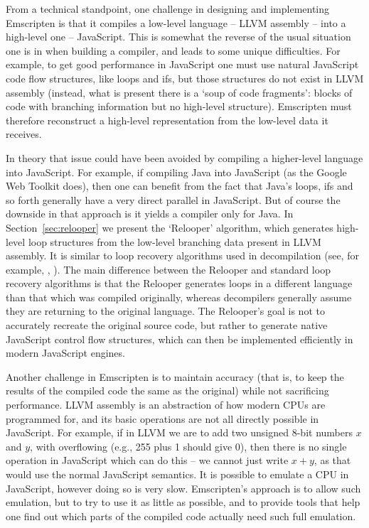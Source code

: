 \documentclass[preprint,10pt]{sigplanconf}
\begin{document}
From a technical standpoint, one challenge in designing and implementing
Emscripten is that it compiles a low-level language -- LLVM assembly -- into
a high-level one -- JavaScript. This is somewhat the reverse of the usual
situation one is in when building a compiler, and leads to some unique
difficulties. For example, to get good performance in JavaScript one must
use natural JavaScript code flow structures, like loops and ifs, but
those structures do not exist in LLVM assembly (instead, what is present
there is a `soup of code fragments': blocks of code with branching information
but no high-level structure).
Emscripten must therefore reconstruct a high-level
representation from the low-level data it receives.

In theory that issue could have been avoided by compiling a higher-level
language into JavaScript. For example, if compiling Java into JavaScript
(as the Google Web Toolkit does), then one can benefit from the fact
that Java's loops, ifs and so forth generally have a very direct parallel
in JavaScript. But of course the downside in that approach is it yields a
compiler only for Java. In Section~\ref{sec:relooper}
we present the `Relooper' algorithm, which generates high-level loop structures from the low-level
branching data present in LLVM assembly. It is similar to loop recovery algorithms used in decompilation
(see, for example, \cite{Cifuentes98assemblyto}, \cite{pro97}).
The main difference between the Relooper and standard loop recovery algorithms
is that the Relooper generates loops in a different language than that which was compiled originally, whereas
decompilers generally assume they are returning to the original language. The Relooper's
goal is not to accurately recreate the original source code, but rather to generate
native JavaScript control flow structures, which can then be implemented
efficiently in modern JavaScript engines.

Another challenge in Emscripten is to maintain accuracy (that is, to
keep the results of the compiled code the same as the original)
while not sacrificing performance. LLVM assembly
is an abstraction of how modern CPUs are programmed for, and its basic
operations are not all directly possible in JavaScript. For example, if in
LLVM we are to add two unsigned 8-bit numbers $x$ and $y$, with overflowing (e.g., 255
plus 1 should give 0), then there is no single operation in JavaScript which
can do this -- we cannot just write $x+y$, as that would use the normal JavaScript
semantics. It is possible to emulate a CPU in JavaScript, however doing so
is very slow. Emscripten's approach is to allow such emulation, but to try to
use it as little as possible, and to provide tools that help one find out
which parts of the compiled code actually need such full emulation.
\end{document}
